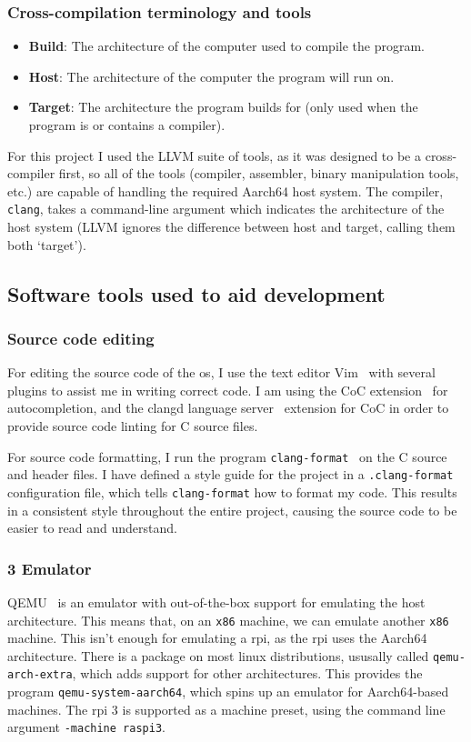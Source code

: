 \documentclass{article}
\begin{document}
\subsubsection{Cross-compilation terminology and tools}
\begin{itemize}
    \item \textbf{Build}: The architecture of the computer used to compile the
        program.
    \item \textbf{Host}: The architecture of the computer the program will run
        on.
    \item \textbf{Target}: The architecture the program builds for (only used
        when the program is or contains a compiler).
\end{itemize}
For this project I used the LLVM suite of tools, as it was designed to be a
cross-compiler first, so all of the tools (compiler, assembler, binary
manipulation tools, etc.) are capable of handling the required Aarch64 host
system. The compiler, \texttt{clang}, takes a command-line argument which indicates
the architecture of the host system (LLVM ignores the difference between host
and target, calling them both `target').
\subsection{Software tools used to aid development}
\subsubsection{Source code editing}
For editing the source code of the \gls{os}, I use the text editor
Vim~\cite{vim} with several plugins to assist me in writing correct code. I am
using the CoC extension~\cite{vim-coc} for autocompletion, and the clangd
language server~\cite{clangd} extension for CoC in order to provide source code
linting for C source files.

For source code formatting, I run the program
\texttt{clang-format}~\cite{clang-format} on the C source and header files. I
have defined a style guide for the project in a \texttt{.clang-format}
configuration file, which tells \texttt{clang-format} how to format my code.
This results in a consistent style throughout the entire project, causing the
source code to be easier to read and understand.

\subsubsection{\texorpdfstring{}{RPi} 3 Emulator}
QEMU~\cite{qemu} is an emulator with out-of-the-box support for emulating the
host architecture. This means that, on an \texttt{x86} machine, we can emulate
another \texttt{x86} machine. This isn't enough for emulating a \gls{rpi}, as
the \gls{rpi} uses the Aarch64 architecture. There is a package on most linux
distributions, ususally called \texttt{qemu-arch-extra}, which adds support for
other architectures. This provides the program \texttt{qemu-system-aarch64},
which spins up an emulator for Aarch64-based machines. The \gls{rpi} 3 is
supported as a machine preset, using the command line argument \texttt{-machine
raspi3}.
\end{document}
